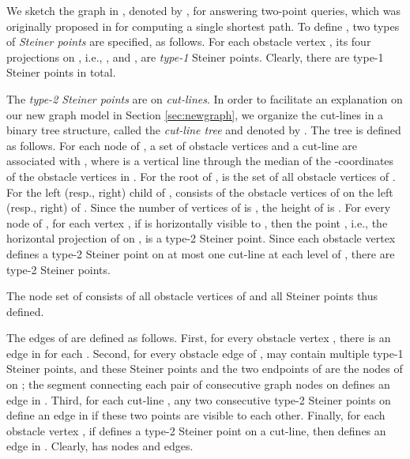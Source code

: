 \documentclass[english,runningheads,11pt]{llncs}
\begin{document}
We sketch the graph in \cite{ref:ChenSh00}, denoted by ,
for answering two-point queries, which was originally proposed in
\cite{ref:ClarksonRe87,ref:ClarksonRe88} for computing a single
shortest path. To define , two types of
{\em Steiner points} are specified, as follows.
For each obstacle vertex , its
four projections on , i.e., , and , are {\em type-1}
Steiner points. Clearly, there are  type-1 Steiner points in total.

The {\em type-2 Steiner points} are on {\em cut-lines}. In
order to facilitate an explanation on our new graph model in Section
\ref{sec:newgraph}, we organize the cut-lines in a binary tree structure,
called the {\em cut-line tree} and denoted by . The tree  is defined as follows.
For each node  of , a set  of obstacle vertices
and a cut-line  are associated with , where  is a
vertical line through the median of the -coordinates of the
obstacle vertices in . For the root  of ,
 is the set of all obstacle vertices of . For the left
(resp., right) child  of ,  consists of the obstacle
vertices of  on the left (resp., right) of .
Since the number of vertices of  is , the height of
 is . For every node  of
, for each vertex , if  is horizontally visible to
, then the point , i.e., the horizontal projection of  on
, is a type-2 Steiner point. Since each obstacle vertex defines
a type-2 Steiner point on at most one cut-line at each level of ,
there are  type-2 Steiner points.

The node set of  consists of all obstacle vertices of 
and all Steiner points thus defined.

The edges of  are defined as follows. First, for every obstacle vertex ,
there is an edge  in  for each . Second, for every obstacle edge  of ,  may contain
multiple type-1 Steiner points, and these Steiner points and the two endpoints
of  are the nodes of  on ;
the segment connecting each pair of consecutive graph nodes on  defines an
edge in . Third, for each cut-line , any two
consecutive type-2 Steiner points on  define an edge in  if
these two points are visible to each other.
Finally, for each obstacle vertex , if  defines a type-2
Steiner point  on a cut-line, then  defines an
edge in .  Clearly,  has  nodes and
 edges.
\end{document}
